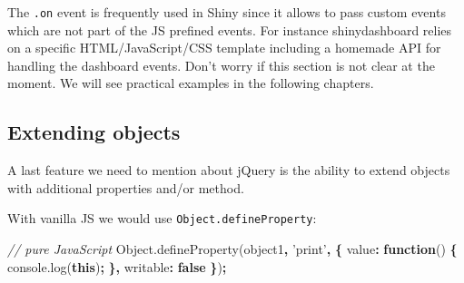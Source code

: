 \documentclass[
]{book}
\newenvironment{Shaded}{\begin{snugshade}}{\end{snugshade}}
\newcommand{\AttributeTok}[1]{\textcolor[rgb]{0.77,0.63,0.00}{#1}}
\newcommand{\CommentTok}[1]{\textcolor[rgb]{0.56,0.35,0.01}{\textit{#1}}}
\newcommand{\DataTypeTok}[1]{\textcolor[rgb]{0.13,0.29,0.53}{#1}}
\newcommand{\DecValTok}[1]{\textcolor[rgb]{0.00,0.00,0.81}{#1}}
\newcommand{\KeywordTok}[1]{\textcolor[rgb]{0.13,0.29,0.53}{\textbf{#1}}}
\newcommand{\NormalTok}[1]{#1}
\newcommand{\OperatorTok}[1]{\textcolor[rgb]{0.81,0.36,0.00}{\textbf{#1}}}
\newcommand{\StringTok}[1]{\textcolor[rgb]{0.31,0.60,0.02}{#1}}
\newcommand{\VariableTok}[1]{\textcolor[rgb]{0.00,0.00,0.00}{#1}}
\begin{document}
The \texttt{.on} event is frequently used in Shiny since it allows to pass custom events which are not part of the JS prefined events. For instance shinydashboard relies on a specific HTML/JavaScript/CSS template including a homemade API for handling the dashboard events. Don't worry if this section is not clear at the moment. We will see practical examples in the following chapters.

\hypertarget{extending-objects}{%
\subsection{Extending objects}\label{extending-objects}}

A last feature we need to mention about jQuery is the ability to extend objects with additional properties and/or method.

\begin{Shaded}
\end{Shaded}

With vanilla JS we would use \texttt{Object.defineProperty}:

\begin{Shaded}
\begin{Highlighting}[]
\CommentTok{// pure JavaScript}
\VariableTok{Object}\NormalTok{.}\AttributeTok{defineProperty}\NormalTok{(object1}\OperatorTok{,} \StringTok{'print'}\OperatorTok{,} \OperatorTok{\{}
  \DataTypeTok{value}\OperatorTok{:} \KeywordTok{function}\NormalTok{() }\OperatorTok{\{}
    \VariableTok{console}\NormalTok{.}\AttributeTok{log}\NormalTok{(}\KeywordTok{this}\NormalTok{)}\OperatorTok{;}
  \OperatorTok{\},}
  \DataTypeTok{writable}\OperatorTok{:} \KeywordTok{false}
\OperatorTok{\}}\NormalTok{)}\OperatorTok{;}
\end{Highlighting}
\end{Shaded}
\end{document}

